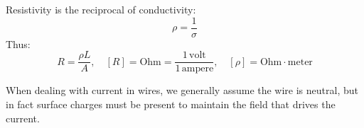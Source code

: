 \begin{definition}[Resistivity]
Resistivity is the reciprocal of conductivity:
\[
    \rho = \frac{1}{\sigma}
\]
Thus:
\[
    R = \frac{\rho L}{A},
    \quad [R] = \text{Ohm} = \frac{1\,\text{volt}}{1\,\text{ampere}},
    \quad [\rho] = \text{Ohm}\cdot\text{meter}
\]
\end{definition}

When dealing with current in wires, we generally assume the wire is neutral, but in fact surface charges must be present to maintain the field that drives the current.
